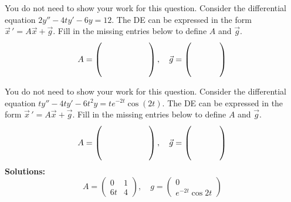 \ifnum {}
    \question[1] You do not need to show your work for this question. Consider the differential equation $2y'' - 4ty' - 6y = 12$. The DE can be expressed in the form $\vec x\, ' = A\vec x + \vec g$. Fill in the missing entries below to define $A$ and $\vec g$.   
    \begin{align*}
     A = \left( \hbox to 2cm{\vbox to 0.85cm{}} \right), \quad \vec g = \left( \hbox to 1.2cm{\vbox to 0.85cm{}} \right)
    \end{align*}
    
\fi



\ifnum {}
    \question[1] You do not need to show your work for this question. Consider the differential equation $ty'' - 4ty' - 6t^2y = te^{-2t}\cos(2t)$. The DE can be expressed in the form $\vec x\, ' = A\vec x + \vec g$. Fill in the missing entries below to define $A$ and $\vec g$.   
    \begin{align*}
     A = \left( \hbox to 2cm{\vbox to 0.85cm{}} \right), \quad \vec g = \left( \hbox to 1.2cm{\vbox to 0.85cm{}} \right)
    \end{align*}
    \ifnum {} {\color{DarkBlue} 
\textbf{Solutions:}
$$A = \begin{pmatrix} 0&1\\6t&4\end{pmatrix}, \quad g = \begin{pmatrix} 0\\e^{-2t}\cos 2t \end{pmatrix}$$
} 
\else 
\newpage
\fi
\fi